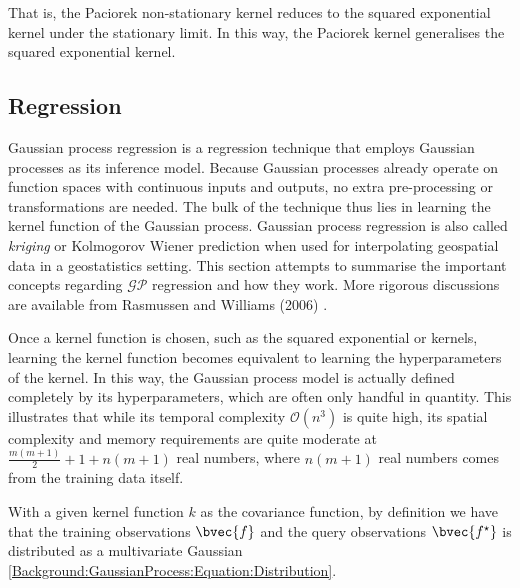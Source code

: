 				That is, the Paciorek non-stationary kernel reduces to the squared exponential kernel under the stationary limit. In this way, the Paciorek kernel generalises the squared exponential kernel.
				
				
				\FloatBarrier
			
		\subsection{Regression}
		\label{Background:GaussianProcesses:Regression}
		
			Gaussian process regression is a regression technique that employs Gaussian processes as its inference model. Because Gaussian processes already operate on function spaces with continuous inputs and outputs, no extra pre-processing or transformations are needed. The bulk of the technique thus lies in learning the kernel function of the Gaussian process. Gaussian process regression is also called \textit{kriging} or Kolmogorov Wiener prediction when used for interpolating geospatial data in a geostatistics setting. This section attempts to summarise the important concepts regarding $\mathcal{GP}$ regression and how they work. More rigorous discussions are available from Rasmussen and Williams (2006) \citep{GaussianProcessForMachineLearning}. 
			
			Once a kernel function is chosen, such as the squared exponential or \matern kernels, learning the kernel function becomes equivalent to learning the hyperparameters of the kernel. In this way, the Gaussian process model is actually defined completely by its hyperparameters, which are often only handful in quantity. This illustrates that while its temporal complexity $\mathcal{O}(n^{3})$ is quite high, its spatial complexity and memory requirements are quite moderate at $\frac{m(m + 1)}{2} + 1 + n(m  + 1)$ real numbers, where $n(m  + 1)$ real numbers comes from the training data itself. %
			
			With a given kernel function $k$ as the covariance function, by definition we have that the training observations $\bvec{f}$ and the query observations $\bvec{f^{\star}}$ is distributed as a multivariate Gaussian \eqref{Background:GaussianProcess:Equation:Distribution}.
			
